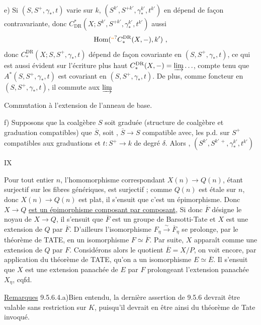 e) Si $(S,S^+,\gamma_*,t)$ varie sur $k$,  $(S^{k'},S^{+k'},\gamma_*^{k'},t^{k'})$ en dépend de façon contravariante, donc $C_{\mathrm{DR}}^*(X;S^{k'},S^{+k'},\gamma_*^{k'},t^{k'})$ aussi
\[
 \mathrm{Hom}(\unsure{\text{\textquotedblleft}}C_*^{\mathrm{DR}}(X,-),k')\ ,
\]
donc $C_*^{\mathrm{DR}}(X;S,S^+,\gamma_*,t)$ dépend de façon covariante en $(S,S^+,\gamma_*,t)$, ce qui est aussi évident sur l'écriture plus haut $C_*^{\mathrm{DR}}(X,-)=\varinjlim\ldots$, compte tenu que $A^*(S,S^+,\gamma_*,t)$ est covariant en $(S,S^+,\gamma_*,t)$. De plus,  comme foncteur en $(S,S^+,\gamma_*,t)$, il commute aux $\varinjlim$ 

Commutation à l'extension de l'anneau de base.

f) Supposons que la coalgèbre $S$ soit graduée (structure de coalgèbre et graduation compatibles) que $\overline S$, soit , $\overline S\to S$ compatible avec, les p.d. sur $S^+$ compatibles aux graduations et $t:S^+\to k$  de degré $\delta$. Alors , $(S^{k'},S^{k'\,+},\gamma_*^{k'},t^{k'})$

\hfill IX

Pour tout entier $n$, l'homomorphisme correspondant $X(n)\longrightarrow Q(n)$, étant surjectif sur les fibres génériques, est surjectif ; comme $Q(n)$ est étale sur $n$, donc $X(n)\longrightarrow Q(n)$ est plat, il s'ensuit que c'est un épimorphisme. Donc $X\longrightarrow Q$ \uline{est un épimorphisme composant par composant}, Si donc $\overline F$ désigne le noyau de $X\longrightarrow Q$, il s'ensuit que $\overline F$ est un groupe de Barsotti-Tate et $X$ est une extension de $Q$ par $\overline F$. D'ailleurs l'isomorphisme $F_\eta\overset{\sim}{\longrightarrow}\overline F_\eta$ se prolonge, par le théorème de TATE, en un isomorphisme $F\simeq\overline F$. Par suite, $X$ apparaît comme une extension de $Q$ par $F$. Considérons alors le quotient $\overline E=X/P$, on voit encore, par application du théorème de TATE, qu'on a un isomorphisme $E\simeq\overline E$. Il s'ensuit que $X$ est une extension panachée de $E$ par $F$ prolongeant l'extension panachée $X_\eta$, cqfd.

\uline{Remarques} 9.5.6.4.\quad a)\quad Bien entendu, la dernière assertion de 9.5.6 devrait être valable sans restriction sur $K$, puisqu'il devrait en être ainsi du théorème de Tate invoqué.

